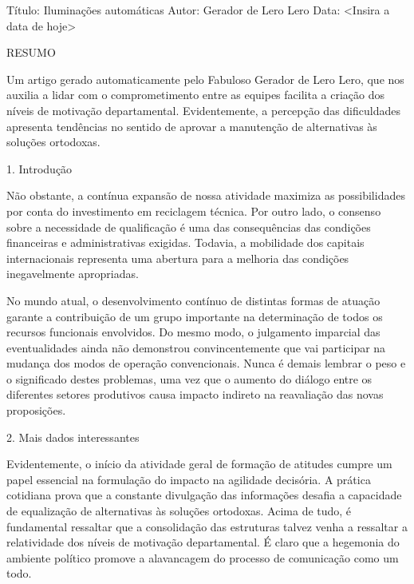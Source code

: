 %
%
%
%
%

Título: Iluminações automáticas
Autor: Gerador de Lero Lero
Data: <Insira a data de hoje>

RESUMO

Um artigo gerado automaticamente pelo Fabuloso Gerador de Lero Lero, que nos
auxilia a lidar com o comprometimento entre as equipes facilita a criação dos
níveis de motivação departamental. Evidentemente, a percepção das dificuldades
apresenta tendências no sentido de aprovar a manutenção de alternativas às
soluções ortodoxas.

1. Introdução

Não obstante, a contínua expansão de nossa atividade maximiza as possibilidades
por conta do investimento em reciclagem técnica. Por outro lado, o consenso
sobre a necessidade de qualificação é uma das consequências das condições
financeiras e administrativas exigidas. Todavia, a mobilidade dos capitais
internacionais representa uma abertura para a melhoria das condições
inegavelmente apropriadas.

No mundo atual, o desenvolvimento contínuo de distintas formas de atuação
garante a contribuição de um grupo importante na determinação de todos os
recursos funcionais envolvidos. Do mesmo modo, o julgamento imparcial das
eventualidades ainda não demonstrou convincentemente que vai participar na
mudança dos modos de operação convencionais. Nunca é demais lembrar o peso e o
significado destes problemas, uma vez que o aumento do diálogo entre os
diferentes setores produtivos causa impacto indireto na reavaliação das novas
proposições.

2. Mais dados interessantes

Evidentemente, o início da atividade geral de formação de atitudes cumpre um
papel essencial na formulação do impacto na agilidade decisória. A prática
cotidiana prova que a constante divulgação das informações desafia a capacidade
de equalização de alternativas às soluções ortodoxas. Acima de tudo, é
fundamental ressaltar que a consolidação das estruturas talvez venha a
ressaltar a relatividade dos níveis de motivação departamental. É claro que a
hegemonia do ambiente político promove a alavancagem do processo de comunicação
como um todo.

